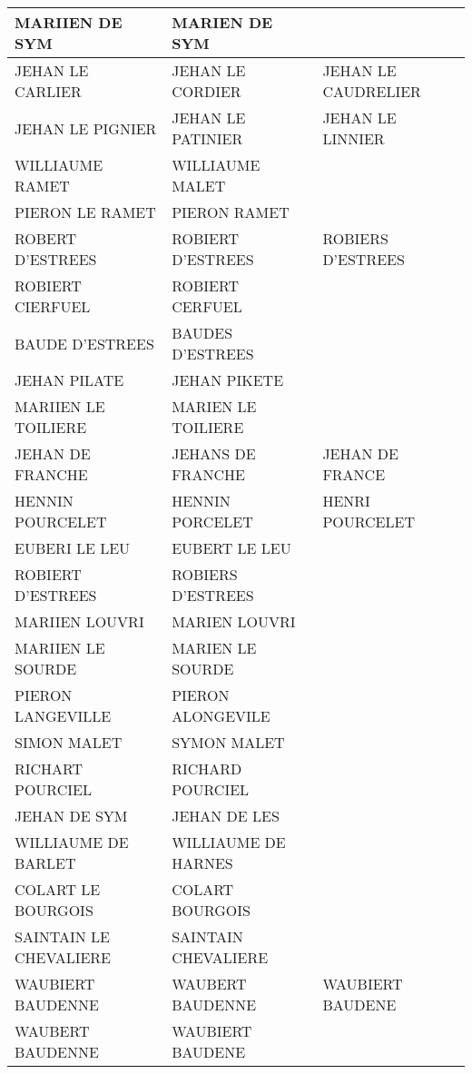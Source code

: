 \small
\begin{center}
\begin{longtable}{|l|l|l|}
\hline		MARIIEN DE SYM	&		 MARIEN DE SYM	&			\\
\hline	\rowcolor{lightgray}	JEHAN LE CARLIER	&		 JEHAN LE CORDIER	&		 JEHAN LE CAUDRELIER	\\
\hline	\rowcolor{lightgray}	JEHAN LE PIGNIER	&		 JEHAN LE PATINIER	&		 JEHAN LE LINNIER	\\
\hline	\rowcolor{lightgray}	WILLIAUME RAMET	&		 WILLIAUME MALET	&			\\
\hline		PIERON LE RAMET	&		 PIERON RAMET	&			\\
\hline		ROBERT D'ESTREES	&		 ROBIERT D'ESTREES	&		 ROBIERS D'ESTREES	\\
\hline		ROBIERT CIERFUEL	&		 ROBIERT CERFUEL	&			\\
\hline		BAUDE D'ESTREES	&		 BAUDES D'ESTREES	&			\\
\hline	\rowcolor{lightgray}	JEHAN PILATE	&		 JEHAN PIKETE	&			\\
\hline		MARIIEN LE TOILIERE	&		 MARIEN LE TOILIERE	&			\\
\hline		JEHAN DE FRANCHE	&		 JEHANS DE FRANCHE	&		 JEHAN DE FRANCE	\\
\hline		HENNIN POURCELET	&		 HENNIN PORCELET	&	\cellcolor{lightgray}	 HENRI POURCELET	\\
\hline		EUBERI LE LEU	&		 EUBERT LE LEU	&			\\
\hline		ROBIERT D'ESTREES	&		 ROBIERS D'ESTREES	&			\\
\hline		MARIIEN LOUVRI	&		 MARIEN LOUVRI	&			\\
\hline		MARIIEN LE SOURDE	&		 MARIEN LE SOURDE	&			\\
\hline		PIERON LANGEVILLE	&		 PIERON ALONGEVILE	&			\\
\hline		SIMON MALET	&		 SYMON MALET	&			\\
\hline		RICHART POURCIEL	&		 RICHARD POURCIEL	&			\\
\hline	\rowcolor{lightgray}	JEHAN DE SYM	&		 JEHAN DE LES	&			\\
\hline	\rowcolor{lightgray}	WILLIAUME DE BARLET	&		 WILLIAUME DE HARNES	&			\\
\hline		COLART LE BOURGOIS	&		 COLART BOURGOIS	&			\\
\hline		SAINTAIN LE CHEVALIERE	&		 SAINTAIN CHEVALIERE	&			\\
\hline		WAUBIERT BAUDENNE	&		 WAUBERT BAUDENNE	&		 WAUBIERT BAUDENE	\\
\hline		WAUBERT BAUDENNE	&		 WAUBIERT BAUDENE	&			\\

\end{longtable}
\end{center}
